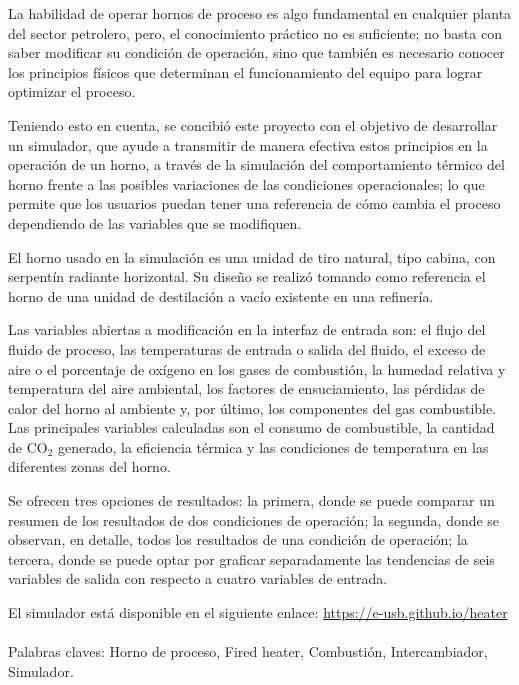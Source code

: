 \documentclass[pregrado]{tesis-usb}
\begin{document}
\frontmatter
\maketitle


\begin{resumen}
    \par La habilidad de operar hornos de proceso es algo fundamental en cualquier planta del sector petrolero, pero, el conocimiento práctico no es suficiente; no basta con saber modificar su condición de operación, sino que también es necesario conocer los principios físicos que determinan el funcionamiento del equipo para lograr optimizar el proceso.
    \par Teniendo esto en cuenta, se concibió este proyecto con el objetivo de desarrollar un simulador, que ayude a transmitir de manera efectiva estos principios en la operación de un horno, a través de la simulación del comportamiento térmico del horno frente a las posibles variaciones de las condiciones operacionales; lo que permite que los usuarios puedan tener una referencia de cómo cambia el proceso dependiendo de las variables que se modifiquen.
    \par El horno usado en la simulación es una unidad de tiro natural, tipo cabina, con serpentín radiante horizontal. Su diseño se realizó tomando como referencia el horno de una unidad de destilación a vacío existente en una refinería.
    \par Las variables abiertas a modificación en la interfaz de entrada son: el flujo del fluido de proceso, las temperaturas de entrada o salida del fluido, el exceso de aire o el porcentaje de oxígeno en los gases de combustión, la humedad relativa y temperatura del aire ambiental, los factores de ensuciamiento, las pérdidas de calor del horno al ambiente y, por último, los componentes del gas combustible. Las principales variables calculadas son el consumo de combustible, la cantidad de CO$_2$ generado, la eficiencia térmica y las condiciones de temperatura en las diferentes zonas del horno.
    \par Se ofrecen tres opciones de resultados: la primera, donde se puede comparar un resumen de los resultados de dos condiciones de operación; la segunda, donde se observan, en detalle, todos los resultados de una condición de operación; la tercera, donde se puede optar por graficar separadamente las tendencias de seis variables de salida con respecto a cuatro variables de entrada.
    \par El simulador está disponible en el siguiente enlace: \url{https://e-usb.github.io/heater}\\
     \vspace{10pt}\\
     Palabras claves: Horno de proceso, Fired heater, Combustión, Intercambiador, Simulador.
\end{resumen}
\tableofcontents
\listoffigures
\listoftables
\useacronyms


\setlength{\parskip}{6px}
\mainmatter









\nocite{*}

\appendix



\end{document}
